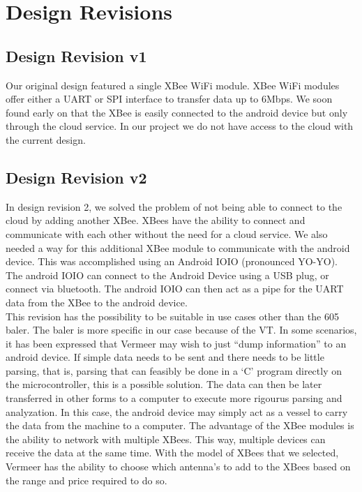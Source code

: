 \documentclass[paper=a4, fontsize=11pt]{scrartcl}
\numberwithin{equation}{section}		%
\numberwithin{figure}{section}			%
\numberwithin{table}{section}				%
\begin{document}
\section{Design Revisions}
\subsection{Design Revision v1} 
Our original design featured a single XBee WiFi module. XBee WiFi modules offer either a UART or SPI interface to transfer data up to 6Mbps. We soon found early on that the XBee is easily connected to the android device but only through the cloud service. In our project we do not have access to the cloud with the current design.\\

\subsection{Design Revision v2} 
In design revision 2, we solved the problem of not being able to connect to the cloud by adding another XBee. XBees have the ability to connect and communicate with each other without the need for a cloud service. We also needed a way for this additional XBee module to communicate with the android device. This was accomplished using an Android IOIO (pronounced YO-YO). The android IOIO can connect to the Android Device using a USB plug, or connect via bluetooth. The android IOIO can then act as a pipe for the UART data from the XBee to the android device. \\

This revision has the possibility to be suitable in use cases other than the 605 baler. The baler is more specific in our case because of the VT. In some scenarios, it has been expressed that Vermeer may wish to just “dump information” to an android device. If simple data needs to be sent and there needs to be little parsing, that is, parsing that can feasibly be  done in a ‘C’ program directly on the microcontroller, this is a possible solution. The data can then be later transferred in other forms to a computer to execute more rigourus parsing and analyzation. In this case, the android device may simply act as a vessel to carry the data from the machine to a computer. The advantage of the XBee modules is the ability to network with multiple XBees. This way, multiple devices can receive the data at the same time. With the model of XBees that we selected, Vermeer has the ability to choose which antenna’s to add to the XBees based on the range and price required to do so. \\
\end{document}
